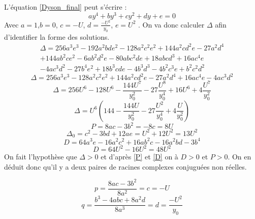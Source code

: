 \documentclass[12pt]{article}
\begin{document}
L'\'equation \ref{Dyson_final} peut s'\'ecrire :
\begin{equation}
 a y^4 + b y^3 + c y^2 + d y + e = 0
\end{equation}
Avec $a = 1$,$b = 0$, $c=-U$, $d = \frac{-U^2}{y_0}$, $e=U^2$ .
On va donc calculer $\Delta$ afin d'identifier la forme des solutions.
\begin{align*}
\label{Delta}
 \Delta = 256a^3 e^3 - 192 a^2bde^2 - 128 a^2 c^2 e^2 + 144a^2cd^2e - 27a^2d^4\\ 
 + 144 ab^2ce^2 - 6ab^2d^2e - 80abc^2de + 18abcd^3 + 16ac^4e\\
 -4ac^3d^2-27b^4e^2+18b^3cde - 4b^3d^3 - 4b^2c^3e+b^2c^2d^2
 \end{align*}
\begin{equation}
 \Delta = 256a^3 e^3 - 128 a^2 c^2 e^2 + 144a^2cd^2e - 27a^2d^4 + 16ac^4e -4ac^3d^2
\end{equation}
\begin{equation}
 \Delta = 256 U^6 -128 U^6 - \frac{144U^7}{y_0^2} - 27 \frac{U^8}{y_0^4} + 16 U^6 + 4 \frac{U^7}{y_0^2}
\end{equation}
\begin{equation}
 \Delta = U^6(144 - \frac{144U}{y_0^2} - 27 \frac{U^2}{y_0^4} + 4 \frac{U}{y_0^2})
\end{equation}
\begin{equation}
\label{P}
 P = 8ac - 3b^2 = -8c = 8U
\end{equation}
\begin{equation}
 \Delta_0 = c^2-3bd + 12ae = U^2 +12U^2 = 13 U ^2
\end{equation}
\begin{equation}
 D = 64a^3e -16a^2c^2 + 16ab^2c - 16a^2bd -3b^4
\end{equation}
\begin{equation}
\label{D}
 D = 64U^2 -16 U^2 = 48 U^2
\end{equation}
On fait l'hypoth\`ese que $\Delta > 0$ et d'apr\`es \ref{P} et \ref{D} on \`a $ D>0$ et $P>0$.
On en d\'eduit donc qu'il y a deux paires de racines complexes conjugu\'ees non r\'eelles.

\begin{equation}
 p = \frac{8ac - 3b^2}{8a^2} = c = -U
\end{equation}
\begin{equation}
 q = \frac{b^3 - 4abc + 8a^2d}{8a^3} = d = \frac{-U^2}{y_0}
\end{equation}
\end{document}
